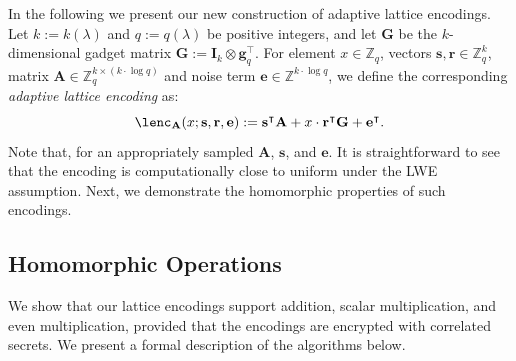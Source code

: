 \documentclass{article}
\newcommand{\Z}{\mathbb{Z}}
\renewcommand{\sec}{\ensuremath{\lambda}}
\newcommand{\id}{\ensuremath{\mathbf{I}}}
\begin{document}
In the following we present our new construction of adaptive lattice encodings. Let $k:=k(\sec)$ and $q:=q(\sec)$ be positive integers, and let $\mathbf{G}$ be the $k$-dimensional gadget matrix $\mathbf{G}:=\id_k\otimes \mathbf{g}_q^\intercal$. For element $x\in\Z_q$, vectors $\mathbf{s}, \mathbf{r}\in\Z_q^k$, matrix $\mathbf{A}\in\Z_q^{k\times (k\cdot \log q)}$ and noise term $\mathbf{e}\in\Z^{k\cdot \log q}$, we define the corresponding \emph{adaptive lattice encoding} as:
\[
\lenc_\mathbf{A} (x;\mathbf{s}, \mathbf{r}, \mathbf{e}) := \mathbf{s}^\intercal\mathbf{A}+ x \cdot \mathbf{r}^\intercal \mathbf{G}+\mathbf{e}^\intercal.
\]
Note that, for an appropriately sampled $\mathbf{A}$, $\mathbf{s}$, and $\mathbf{e}$. It is straightforward to see that the encoding is computationally close to uniform under the LWE assumption. Next, we demonstrate the homomorphic properties of such encodings.

\subsection{Homomorphic Operations}\label{sec:hom_enc}

We show that our lattice encodings support addition, scalar multiplication, and even multiplication, provided that the encodings are encrypted with correlated secrets. We present a formal description of the algorithms below.
\end{document}
